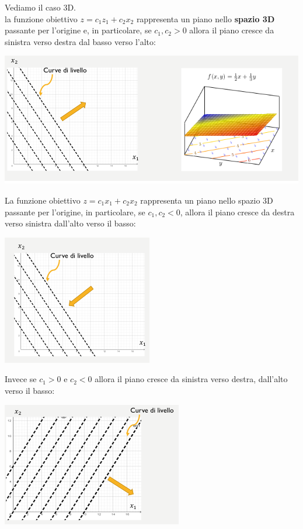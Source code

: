 \message{ !name(ro.tex)}\documentclass[a4paper,12pt, oneside]{book}
\begin{document}
Vediamo il caso 3D.\\
la funzione obiettivo $z=c_1z_1+c_2x_2$ rappresenta un piano nello
\textbf{spazio 3D} passante per l’origine e, in particolare, se
$c_1,c_2>0$ allora il piano cresce da sinistra verso destra dal basso
verso l’alto:
\begin{center}
  \includegraphics[scale = 0.7]{img/3d.png}
\end{center}
La funzione obiettivo $z=c_1x_1+c_2x_2$ rappresenta un piano nello
spazio 3D passante per l’origine, in particolare, se $c_1,c_2<0$,
allora il piano cresce da destra verso sinistra dall’alto verso il
basso:
\begin{center}
  \includegraphics[scale = 0.7]{img/3d2.png}
\end{center}
Invece se $c_1>0$ e $c_2<0$ allora il piano cresce da sinistra verso
destra, dall’alto verso il basso:
\begin{center}
  \includegraphics[scale = 0.7]{img/3d3.png}
\end{center}
\end{document}
